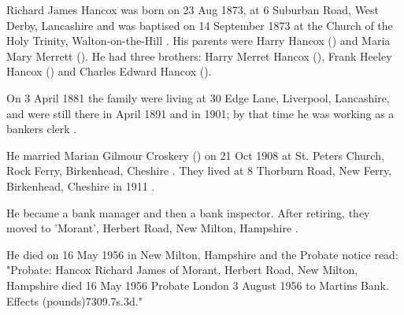 
Richard James Hancox was born on 23 Aug 1873, at 6 Suburban Road, West Derby, Lancashire \cite{RJHancoxBirth} and was baptised on 14 September 1873 at the Church of the Holy Trinity, Walton-on-the-Hill \cite{RJHancoxBaptism}.  His parents were Harry Hancox () and  Maria Mary Merrett (). He had three brothers: Harry Merret Hancox (), Frank Heeley Hancox () and Charles Edward Hancox ().


On 3 April 1881 the family were living at 30 Edge Lane, Liverpool, Lancashire, \cite{RJHancoxResidence1} and were still there in April 1891 \cite{RJHancoxResidence2} and in 1901; by that time he was working as a bankers clerk \cite{RJHancoxOccupation}.

He married Marian Gilmour Croskery () on 21 Oct 1908 at St. Peters Church,  Rock Ferry, Birkenhead, Cheshire \cite{RJHancoxMarriage}.  They lived at 8 Thorburn Road, New Ferry, Birkenhead, Cheshire in 1911 \cite{RJHancoxResidence3}.

He became a bank manager and then a bank inspector.  After retiring, they moved to 'Morant', Herbert Road, New Milton, Hampshire \cite{RJHancoxResidence4}.


He died on 16 May 1956  in New Milton, Hampshire \cite{RJHancoxDeath} and the Probate notice read:
"Probate: Hancox Richard James of Morant, Herbert Road, New Milton, Hampshire died 16 May 1956 Probate London 3 August 1956 to Martins Bank. Effects (pounds)7309.7s.3d."\cite{RichardHancoxProbate}
